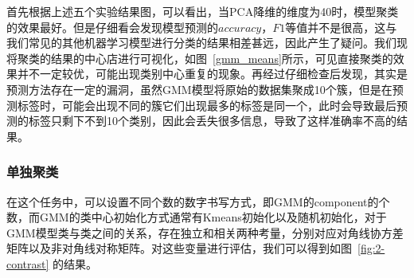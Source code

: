 \documentclass[UTF8]{ctexart}
\begin{document}







首先根据上述五个实验结果图，可以看出，当PCA降维的维度为40时，模型聚类的效果最好。但是仔细看会发现模型预测的$accuracy$，$F1$等值并不是很高，这与我们常见的其他机器学习模型进行分类的结果相差甚远，因此产生了疑问。我们现将聚类的结果的中心店进行可视化，如图~\ref{gmm_means}所示，可见直接聚类的效果并不一定较优，可能出现类别中心重复的现象。再经过仔细检查后发现，其实是预测方法存在一定的漏洞，虽然GMM模型将原始的数据集聚成10个簇，但是在预测标签时，可能会出现不同的簇它们出现最多的标签是同一个，此时会导致最后预测的标签只剩下不到10个类别，因此会丢失很多信息，导致了这样准确率不高的结果。



\subsubsection{单独聚类}

在这个任务中，可以设置不同个数的数字书写方式，即GMM的component的个数，而GMM的类中心初始化方式通常有Kmeans初始化以及随机初始化，对于GMM模型类与类之间的关系，存在独立和相关两种考量，分别对应对角线协方差矩阵以及非对角线对称矩阵。对这些变量进行评估，我们可以得到如图~\ref{fig:2-contrast} 的结果。
\end{document}
